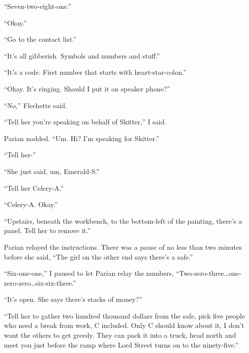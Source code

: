 ``Seven-two-eight-one.''



``Okay.''



``Go to the contact list.''



``It's all gibberish.  Symbols and numbers and stuff.''



``It's a code.  First number that starts with heart-star-colon.''



``Okay.  It's ringing.  Should I put it on speaker phone?''



``No,'' Flechette said.



``Tell her you're speaking on behalf of Skitter,'' I said.



Parian nodded.  ``Um.  Hi?  I'm speaking for Skitter.''



``Tell her-''



``She just said, um, Emerald-S.''



``Tell her Celery-A.''



``Celery-A.  Okay.''



``Upstairs, beneath the workbench, to the bottom-left of the painting, there's a panel.  Tell her to remove it.''



Parian relayed the instructions.  There was a pause of no less than two minutes before she said,  ``The girl on the other end says there's a safe.''



``Six-one-one,'' I paused to let Parian relay the numbers, ``Two-zero-three\ldots one-zero-zero\ldots six-six-three.''



``It's open.  She says there's stacks of money?''



``Tell her to gather two hundred thousand dollars from the safe, pick five people who need a break from work, C included.  Only C should know about it, I don't want the others to get greedy.  They can pack it into a truck, head north and meet you just before the ramp where Lord Street turns on to the ninety-five.''



